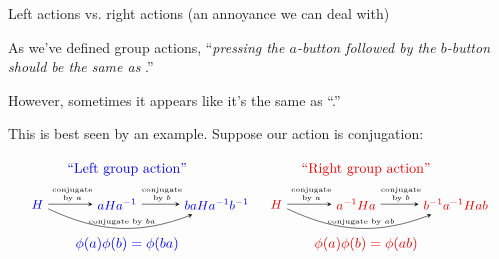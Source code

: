 \documentclass[8pt,handout]{beamer}
\newcommand{\Pause}{}      %
\begin{document}

\begin{frame}{Left actions vs. right actions (an annoyance we can deal with)} 
  
  As we've defined group actions, ``\emph{pressing the $a$-button
    followed by the $b$-button should be the same as }.''
  
  \medskip\Pause
  
  However, sometimes it appears like it's the same as
  ``\emph{}.''
  
  \medskip\Pause
  
  This is best seen by an example. Suppose our action is
  conjugation: \vspace{-3mm}
  
  \[
  \begin{tikzpicture}[scale=.5] 
    \tikzstyle{to} = [draw,-stealth]
    \begin{scope}[shift={(0,0)}]
      \node (H) at (0,0) {\small \color{xBlue}$H$};
      \node (aH) at (4,0) {\small \color{xBlue}$aHa^{-1}$};
      \node (baH) at (9,0) {\small \color{xBlue}$baHa^{-1}b^{-1}$};
      \draw[to] (H) to (aH);
      \draw[to] (aH) to (baH);
      \draw[to,bend right=23] (H) to (baH);
      \node at (1.75,.7) {\tiny conjugate};
      \node at (1.75,.3) {\tiny by $a$};
      \node at (6.25,.7) {\tiny conjugate};
      \node at (6.25,.3) {\tiny by $b$};
      \node at (4.25,-.88) {\tiny conjugate by $ba$};
      \node at (4.5,-2) {\Balert{$\phi(a)\phi(b)=\phi(ba)$}};
      \node at (4.5,1.75) {\Balert{``Left group action''}};
    \end{scope}
    \begin{scope}[shift={(12,0)}]
      \node (H) at (0,0) {\small \Alert{$H$}};
      \node (aH) at (4,0) {\small \Alert{$a^{-1}Ha$}};
      \node (baH) at (9,0) {\small \Alert{$b^{-1}a^{-1}Hab$}};
      \draw[to] (H) to (aH);
      \draw[to] (aH) to (baH);
      \draw[to,bend right=23] (H) to (baH);
      \node at (1.75,.7) {\tiny conjugate};
      \node at (1.75,.3) {\tiny by $a$};
      \node at (6.25,.7) {\tiny conjugate};
      \node at (6.25,.3) {\tiny by $b$};
      \node at (4.25,-.88) {\tiny conjugate by $ab$};
      \node at (4.5,-2) {\Alert{$\phi(a)\phi(b)=\phi(ab)$}};
      \node at (4.5,1.75) {\Alert{``Right group action''}};
    \end{scope}
  \end{tikzpicture}
  \]
  

\end{frame}
\end{document}
